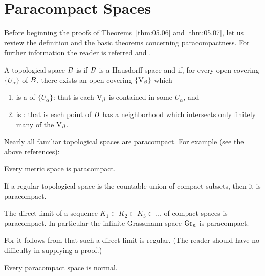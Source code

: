 \documentclass[../main]{subfiles}
\begin{document}
\section{Paracompact Spaces} \label{sec:5.3}
Before beginning the proofs of Theorems~\ref{thm:05.06} and \ref{thm:05.07}, let us review the definition and the basic theorems concerning paracompactness. For further information the reader is referred \cite{kelley1955} and \cite{dugundji1966}. 

\begin{definition}
A topological space $B$ is  if $B$ is a Hausdorff space and if, for every open covering $\{U_\alpha\}$ of $B$, there exists an open covering $\{\operatorname{V}_\beta\}$ which

\begin{enumerate}[label=\arabic*)]
    \item is a  of $\{U_\alpha\}$: that is each $\operatorname{V}_\beta$ is contained in some $U_\alpha$, and
    \item is : that is each point of $B$ has a neighborhood which intersects only finitely many of the $\operatorname{V}_\beta$. 
\end{enumerate}
\end{definition}

Nearly all familiar topological spaces are paracompact. For example (see the above references):
\begin{theorem*}[A. H. Stone]\label{thm:5.8}
Every metric space is paracompact.
\end{theorem*}
\begin{theorem*}[Morita]\label{thm:05.09}
If a regular topological space is the countable union of compact subsets, then it is paracompact.
\end{theorem*}

\begin{corollary*}
The direct limit of a sequence $K_1 \subset K_2 \subset K_3 \subset \ldots$ of compact spaces is paracompact. In particular the infinite Grassmann space $\operatorname{Gr}_n$ is paracompact. 
\end{corollary*}

For it follows from \cite[\S 18.3]{whitehead1961} that such a direct limit is regular. (The reader should have no difficulty in supplying a proof.)
\begin{theorem*}[Dieudonné]
Every paracompact space is normal.
\end{theorem*}
\end{document}
